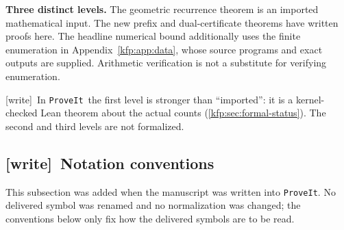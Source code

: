 \documentclass[11pt,a4paper]{article}
\theoremstyle{definition}
\theoremstyle{remark}
\newcommand{\repo}{\texttt{ProveIt}}
\newcommand{\wtag}{\textsf{\small[write]}}
\begin{document}
\begin{resultbox}
\textbf{Three distinct levels.}
The geometric recurrence theorem is an imported mathematical input.
The new prefix and dual-certificate theorems have written proofs here.
The headline numerical bound additionally uses the finite enumeration in
Appendix~\ref{kfp:app:data}, whose source programs and exact outputs are supplied.
Arithmetic verification is not a substitute for verifying enumeration.

\smallskip
\wtag\ In \repo\ the first level is stronger than ``imported'': it is a
kernel-checked Lean theorem about the actual counts
(\cref{kfp:sec:formal-status}). The second and third levels are not
formalized.
\end{resultbox}

\subsection{\wtag\ Notation conventions}
\label{kfp:sec:notation}
This subsection was added when the manuscript was written into \repo. No
delivered symbol was renamed and no normalization was changed; the
conventions below only fix how the delivered symbols are to be read.
\end{document}
